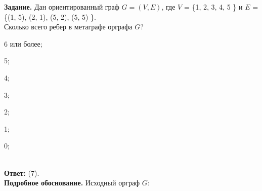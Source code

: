 \documentclass{article}
\begin{document}
\pagestyle{empty}


\noindent\textbf{Задание.} Дан ориентированный граф $G = (V, E)$, где
$V$ = \{1, 2, 3, 4, 5 \} и $E$ = \{(1, 5), (2, 1), (5, 2), (5, 5) \}.\\
Сколько всего ребер в метаграфе орграфа $G$?
\vspace{2mm}

\noindent\begin{inparaenum}[(1)]
\item 6 или более;
 \item 5; \item 4; \item 3; \item 2; \item 1; \item 0;\end{inparaenum}\\



\noindent\textbf{Ответ:} (7).\\



\noindent\textbf{Подробное обоснование.}
Исходный орграф $G$:
\vspace{8mm}
\end{document}
